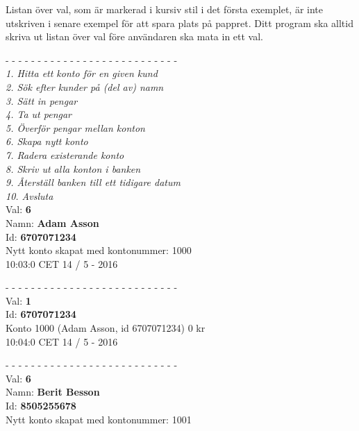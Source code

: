 Listan över val, som är markerad i kursiv stil i det första exemplet, är inte utskriven i senare exempel för att spara plats på pappret. Ditt program ska alltid skriva ut listan över val före användaren ska mata in ett val.

\newenvironment{exampleblock}
	{\begin{minipage}{\columnwidth}
	 - - - - - - - - - - - - - - - - - - - - - - - - - - -\\}
	{\end{minipage}}

\begin{multicols}{2}
\noindent
\begin{exampleblock}
\textit{
1.   Hitta ett konto för en given kund\\
2.   Sök efter kunder på (del av) namn\\
3.   Sätt in pengar\\
4.   Ta ut pengar\\
5.   Överför pengar mellan konton\\
6.   Skapa nytt konto\\
7.   Radera existerande konto\\
8.   Skriv ut alla konton i banken\\
9.   Återställ banken till ett tidigare datum\\
10.  Avsluta\\
}
Val: \textbf{6}\\
Namn: \textbf{Adam Asson}\\
Id: \textbf{6707071234}\\
Nytt konto skapat med kontonummer: 1000\\
10:03:0 CET 14 / 5 - 2016\\
\end{exampleblock}
\begin{exampleblock}
Val: \textbf{1}\\
Id: \textbf{6707071234}\\
Konto 1000 (Adam Asson, id 6707071234) 0 kr\\
10:04:0 CET 14 / 5 - 2016\\
\end{exampleblock}
\begin{exampleblock}
Val: \textbf{6}\\
Namn: \textbf{Berit Besson}\\
Id: \textbf{8505255678}\\
Nytt konto skapat med kontonummer: 1001\\

\end{exampleblock}
\end{multicols}
